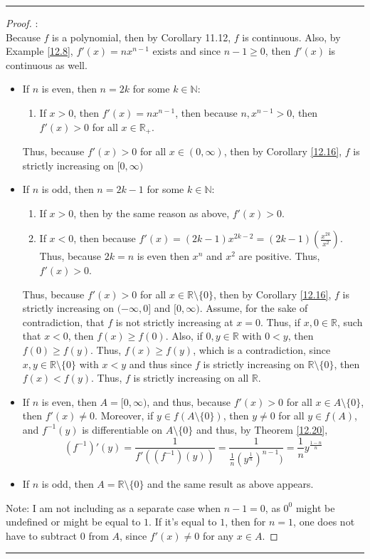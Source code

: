 \documentclass[openany, amssymb, psamsfonts]{amsart}
\newcommand{\bbN}{\mathbb{N}}
\newcommand{\bbR}{\mathbb{R}}
\theoremstyle{definition}
\numberwithin{equation}{section}
\begin{document}
\vspace{4pt}     \hrule   \vspace{4pt} \begin{proof}:\\
Because $f$ is a polynomial, then by Corollary 11.12, $f$ is continuous. Also, by Example \ref{12.8}, $f'(x) = nx^{n-1}$ exists and since $n-1\geq 0$, then $f'(x)$ is continuous as well. 
\begin{itemize}
    \item If $n$ is even, then $n=2k$ for some $k\in \bbN$:
    \begin{enumerate}
        \item If $x>0$, then $f'(x) = nx^{n-1}$, then because $n, x^{n-1}>0$, then $f'(x)>0$ for all $x\in \bbR_+$.
    \end{enumerate}
    Thus, because $f'(x)>0$ for all $x\in (0, \infty)$, then by Corollary \ref{12.16}, $f$ is strictly increasing on $[0,\infty)$
    \item If $n$ is odd, then $n = 2k-1$ for some $k\in \bbN$:
    \begin{enumerate}
        \item If $x>0$, then by the same reason as above, $f'(x)>0$.
        \item If $x<0$, then because $f'(x) = (2k-1)x^{2k-2} = (2k-1)(\frac{x^{2k}}{x^2})$. Thus, because $2k=n$ is even then $x^n$ and $x^2$ are positive. Thus, $f'(x)>0$. 
    \end{enumerate}
    Thus, because $f'(x)>0$ for all $x\in \bbR\setminus\{0\}$, then by Corollary \ref{12.16}, $f$ is strictly increasing on $(-\infty, 0]$ and $[0,\infty)$.
    Assume, for the sake of contradiction, that $f$ is not strictly increasing at $x = 0$. Thus, if $x, 0 \in \bbR$, such that $x<0$, then $f(x)\geq f(0)$. Also, if $0,y \in \bbR$ with $0<y$, then $f(0) \geq f(y)$. Thus, $f(x) \geq f(y)$, which is a contradiction, since $x,y \in \bbR\setminus\{0\}$ with $x<y$ and thus since $f$ is strictly increasing on $\bbR\setminus\{0\}$, then $f(x) < f(y)$. Thus, $f$ is strictly increasing on all $\bbR$.   
\end{itemize}
\begin{itemize}
    \item If $n$ is even, then $A = [0,\infty)$, and thus, because $f'(x) >0$ for all $x\in A\setminus\{0\}$, then $f'(x) \neq 0$. Moreover, if $y\in f(A\setminus\{0\})$, then $y\neq 0$ for all $y\in f(A)$, and $f^{-1}(y)$ is differentiable on $A\setminus\{0\}$ and thus, by Theorem \ref{12.20},
\[(f^{-1})'(y) = \frac{1}{f'((f^{-1})(y))} = \frac{1}{\frac{1}{n}(y^{\frac{1}{n}})^{{n-1}})} = \frac{1}{n}y^{\frac{1-n}{n}}\]
\item If $n$ is odd, then $A = \bbR \setminus\{0\}$ and the same result as above appears.
\end{itemize}
Note: I am not including as a separate case when $n-1 = 0$, as $0^0$ might be undefined or might be equal to $1$. If it's equal to $1$, then for $n=1$, one does not have to subtract $0$ from $A$, since $f'(x) \neq 0$ for any $x\in A$. 
\end{proof}\vspace{4pt}     \hrule   \vspace{4pt}
\end{document}
